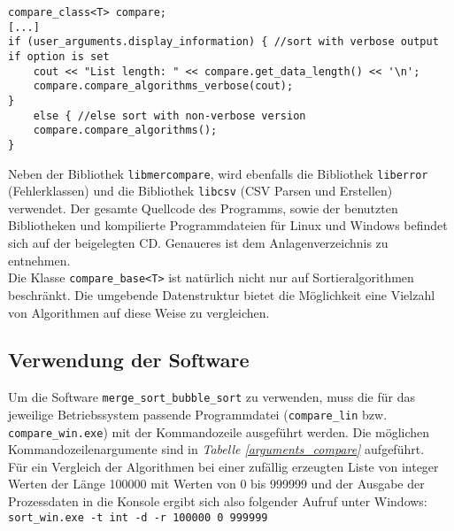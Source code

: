 \begin{lstlisting}
compare_class<T> compare;
[...]
if (user_arguments.display_information) { //sort with verbose output if option is set
	cout << "List length: " << compare.get_data_length() << '\n';
	compare.compare_algorithms_verbose(cout);
}
	else { //else sort with non-verbose version
	compare.compare_algorithms();
}
\end{lstlisting}
Neben der Bibliothek \texttt{libmercompare}, wird ebenfalls die Bibliothek \texttt{liberror} (Fehlerklassen) und die Bibliothek \texttt{libcsv} (\ac{CSV} Parsen und Erstellen) verwendet.
Der gesamte Quellcode des Programms, sowie der benutzten Bibliotheken und kompilierte Programmdateien für Linux und Windows befindet sich auf der beigelegten CD. Genaueres ist dem Anlagenverzeichnis zu entnehmen.\\[0.25 cm]
Die Klasse \texttt{compare\_base<T>} ist natürlich nicht nur auf Sortieralgorithmen beschränkt. Die umgebende Datenstruktur bietet die Möglichkeit eine Vielzahl von Algorithmen auf diese Weise zu vergleichen.

\subsection{Verwendung der Software}
Um die Software \texttt{merge\_sort\_bubble\_sort} zu verwenden, muss die für das jeweilige Betriebssystem passende Programmdatei (\texttt{compare\_lin} bzw. \\ \texttt{compare\_win.exe}) mit der Kommandozeile ausgeführt werden. Die möglichen Kommandozeilenargumente sind in \textit{Tabelle \ref{arguments_compare}} aufgeführt.\\
Für ein Vergleich der Algorithmen bei einer zufällig erzeugten Liste von integer Werten der Länge 100000 mit Werten von 0 bis 999999 und der Ausgabe der Prozessdaten in die Konsole ergibt sich also folgender Aufruf unter Windows:\\[0.25 cm]
\texttt{sort\_win.exe -t int -d -r 100000 0 999999}
